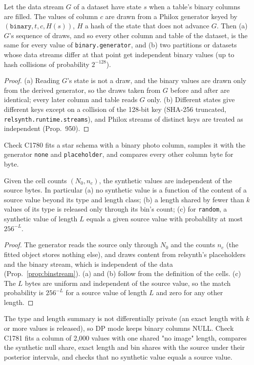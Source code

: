 \setcounter{proposition}{1779}
\begin{proposition}\label{prop:binstream}
Let the data stream $G$ of a dataset have state $s$ when a table's binary columns are filled. The values of column $c$ are drawn from a Philox generator keyed by $(\texttt{binary}, t, c, H(s))$, $H$ a hash of the state that does not advance $G$. Then (a) $G$'s sequence of draws, and so every other column and table of the dataset, is the same for every value of \texttt{binary.generator}, and (b) two partitions or datasets whose data streams differ at that point get independent binary values (up to hash collisions of probability $2^{-128}$).
\end{proposition}
\begin{proof}
(a) Reading $G$'s state is not a draw, and the binary values are drawn only from the derived generator, so the draws taken from $G$ before and after are identical; every later column and table reads $G$ only. (b) Different states give different keys except on a collision of the 128-bit key (SHA-256 truncated, \texttt{relsynth.runtime.streams}), and Philox streams of distinct keys are treated as independent (Prop.~950).
\end{proof}
\noindent Check C1780 fits a star schema with a binary photo column, samples it with the generator \texttt{none} and \texttt{placeholder}, and compares every other column byte for byte.

\setcounter{proposition}{1780}
\begin{proposition}\label{prop:binrelease}
Given the cell counts $(N_0, n_c)$, the synthetic values are independent of the source bytes. In particular (a) no synthetic value is a function of the content of a source value beyond its type and length class; (b) a length shared by fewer than $k$ values of its type is released only through its bin's count; (c) for \texttt{random}, a synthetic value of length $L$ equals a given source value with probability at most $256^{-L}$.
\end{proposition}
\begin{proof}
The generator reads the source only through $N_0$ and the counts $n_c$ (the fitted object stores nothing else), and draws content from relsynth's placeholders and the binary stream, which is independent of the data (Prop.~\ref{prop:binstream}). (a) and (b) follow from the definition of the cells. (c) The $L$ bytes are uniform and independent of the source value, so the match probability is $256^{-L}$ for a source value of length $L$ and zero for any other length.
\end{proof}
\noindent The type and length summary is not differentially private (an exact length with $k$ or more values is released), so DP mode keeps binary columns NULL. Check C1781 fits a column of 2{,}000 values with one shared "no image" length, compares the synthetic null share, exact length and bin shares with the source under their posterior intervals, and checks that no synthetic value equals a source value.

